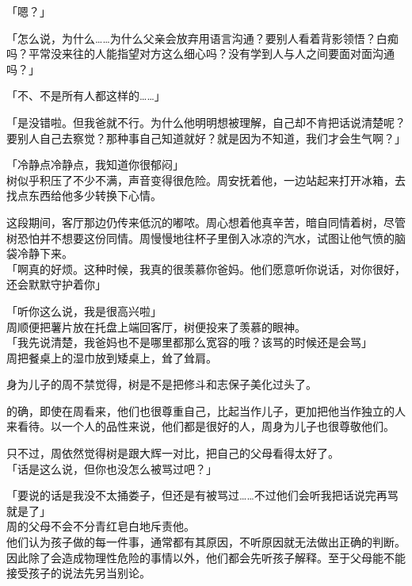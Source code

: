 「嗯？」

「怎么说，为什么……为什么父亲会放弃用语言沟通？要别人看着背影领悟？白痴吗？平常没来往的人能指望对方这么细心吗？没有学到人与人之间要面对面沟通吗？」

「不、不是所有人都这样的……」

「是没错啦。但我爸就不行。为什么他明明想被理解，自己却不肯把话说清楚呢？要别人自己去察觉？那种事自己知道就好？就是因为不知道，我们才会生气啊？」

「冷静点冷静点，我知道你很郁闷」\\

树似乎积压了不少不满，声音变得很危险。周安抚着他，一边站起来打开冰箱，去找点东西给他多少转换下心情。

这段期间，客厅那边仍传来低沉的嘟哝。周心想着他真辛苦，暗自同情着树，尽管树恐怕并不想要这份同情。周慢慢地往杯子里倒入冰凉的汽水，试图让他气愤的脑袋冷静下来。\\

「啊真的好烦。这种时候，我真的很羡慕你爸妈。他们愿意听你说话，对你很好，还会默默守护着你」

「听你这么说，我是很高兴啦」\\

周顺便把薯片放在托盘上端回客厅，树便投来了羡慕的眼神。\\

「我先说清楚，我爸妈也不是哪里都那么宽容的哦？该骂的时候还是会骂」\\

周把餐桌上的湿巾放到矮桌上，耸了耸肩。

身为儿子的周不禁觉得，树是不是把修斗和志保子美化过头了。

的确，即使在周看来，他们也很尊重自己，比起当作儿子，更加把他当作独立的人来看待。以一个人的品性来说，他们都是很好的人，周身为儿子也很尊敬他们。

只不过，周依然觉得树是跟大辉一对比，把自己的父母看得太好了。\\

「话是这么说，但你也没怎么被骂过吧？」

「要说的话是我没不太捅娄子，但还是有被骂过……不过他们会听我把话说完再骂就是了」\\

周的父母不会不分青红皂白地斥责他。\\

他们认为孩子做的每一件事，通常都有其原因，不听原因就无法做出正确的判断。因此除了会造成物理性危险的事情以外，他们都会先听孩子解释。至于父母能不能接受孩子的说法先另当别论。\\

